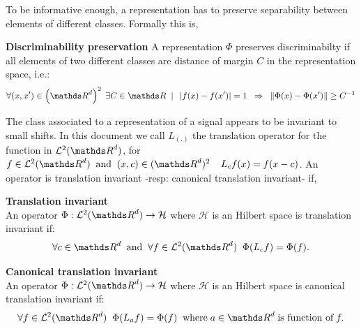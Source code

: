 \documentclass[a4paper,11pt]{report}
\begin{document}
			To be informative enough, a representation has to preserve separability between elements of different classes. Formally this is,
      
			\begin{prop} \textbf{Discriminability preservation}
				A representation $\Phi$ preserves discriminabilty if all elements of two different classes are distance of margin $C$ in the representation space, i.e.:
				\begin{equation*}
					\forall (x,x') \in \left(\dsR^{d}\right)^{2} \; \exists C \in \dsR \;\; | \;\; \abs{f(x)-f(x')} = 1 \;\; \Rightarrow \;\; \norm{\Phi(x)-\Phi(x')} \geq C^{-1}
				\end{equation*}
				\label{pty:Discriminabilty}
			\end{prop}
  
      The class associated to a representation of a signal appears to be invariant to small shifts. In this document we call $L_{(.)}$ the translation operator for the function in $\mathcal{L}^{2}(\dsR^{d})$, \ie for $f \in \mathcal{L}^{2}(\dsR^{d}) \;\; \text{and} \;\; (x,c) \in (\dsR^{d})^{2} \;\;\;\; L_{c}f(x) = f(x-c)$. An operator is translation invariant -resp: canonical translation invariant- if,

      \begin{prop} \textbf{Translation invariant}\\ 
				An operator $\Phi: \mathcal{L}^{2}(\dsR^{d}) \rightarrow \mathcal{H}$ where $\mathcal{H}$ is an Hilbert space is translation invariant if:
	      	\begin{equation*}
			  		\forall c \in \dsR^{d} 
			  		\;\; \text{and}  \;\;
			  		\forall f \in \mathcal{L}^{2}(\dsR^{d}) \;\;
			  		\Phi(L_{c}f) = \Phi(f).
				\end{equation*}
				\label{pty:Translation invariance - intuition}
      \end{prop}
      \vspace{-30pt}
      \begin{prop} \textbf{Canonical translation invariant}\\ 
				An operator $\Phi: \mathcal{L}^{2}(\dsR^{d}) \rightarrow \mathcal{H}$ where $\mathcal{H}$ is an Hilbert space is canonical translation invariant if:
        \begin{equation*}
			  		\forall f \in \mathcal{L}^{2}(\dsR^{d}) \;\;
			  		\Phi(L_{a}f) = \Phi(f) 
			  		\;\; \text{where} \; a \in \dsR^{d} \; \text{is function of} \; f.
				\end{equation*}
				\label{pty:Canonical translation invariance - intuition}
      \end{prop}
      
\end{document}
